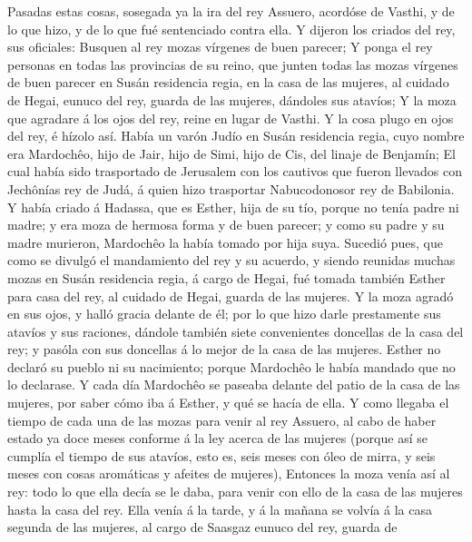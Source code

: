  Pasadas estas cosas, sosegada ya la ira del rey Assuero,
acordóse de Vasthi, y de lo que hizo, y de lo que fué sentenciado contra
ella.  Y dijeron los criados del rey, sus oficiales:
Busquen al rey mozas vírgenes de buen parecer;  Y ponga el
rey personas en todas las provincias de su reino, que junten todas las
mozas vírgenes de buen parecer en Susán residencia regia, en la casa de
las mujeres, al cuidado de Hegai, eunuco del rey, guarda de las mujeres,
dándoles sus atavíos;  Y la moza que agradare á los ojos
del rey, reine en lugar de Vasthi. Y la cosa plugo en ojos del rey, é
hízolo así.  Había un varón Judío en Susán residencia
regia, cuyo nombre era Mardochêo, hijo de Jair, hijo de Simi, hijo de
Cis, del linaje de Benjamín;  El cual había sido
trasportado de Jerusalem con los cautivos que fueron llevados con
Jechônías rey de Judá, á quien hizo trasportar Nabucodonosor rey de
Babilonia.  Y había criado á Hadassa, que es Esther, hija
de su tío, porque no tenía padre ni madre; y era moza de hermosa forma y
de buen parecer; y como su padre y su madre murieron, Mardochêo la había
tomado por hija suya.  Sucedió pues, que como se divulgó
el mandamiento del rey y su acuerdo, y siendo reunidas muchas mozas en
Susán residencia regia, á cargo de Hegai, fué tomada también Esther para
casa del rey, al cuidado de Hegai, guarda de las mujeres. 
Y la moza agradó en sus ojos, y halló gracia delante de él; por lo que
hizo darle prestamente sus atavíos y sus raciones, dándole también siete
convenientes doncellas de la casa del rey; y pasóla con sus doncellas á
lo mejor de la casa de las mujeres.  Esther no declaró su
pueblo ni su nacimiento; porque Mardochêo le había mandado que no lo
declarase.  Y cada día Mardochêo se paseaba delante del
patio de la casa de las mujeres, por saber cómo iba á Esther, y qué se
hacía de ella.  Y como llegaba el tiempo de cada una de
las mozas para venir al rey Assuero, al cabo de haber estado ya doce
meses conforme á la ley acerca de las mujeres (porque así se cumplía el
tiempo de sus atavíos, esto es, seis meses con óleo de mirra, y seis
meses con cosas aromáticas y afeites de mujeres), 
Entonces la moza venía así al rey: todo lo que ella decía se le daba,
para venir con ello de la casa de las mujeres hasta la casa del rey.
 Ella venía á la tarde, y á la mañana se volvía á la casa
segunda de las mujeres, al cargo de Saasgaz eunuco del rey, guarda de
